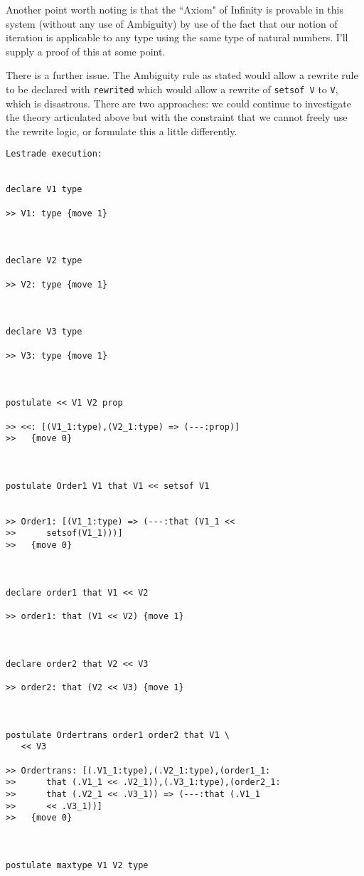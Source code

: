\documentclass[12pt]{article}
\begin{document}
Another point worth noting is that the ``Axiom" of Infinity is provable in this system (without any use of Ambiguity) by use of the fact that our notion of iteration is applicable to any type using the same type of natural numbers.  I'll supply a proof of this at some point.

There is a further issue.  The Ambiguity rule as stated would allow a rewrite rule to be declared with {\tt rewrited} which would allow a rewrite of {\tt setsof V} to {\tt V}, which is disastrous.  There are two approaches:  we could continue to investigate the theory articulated above but with the constraint
that we cannot freely use the rewrite logic, or formulate this a little differently.

\begin{verbatim}Lestrade execution:


declare V1 type

>> V1: type {move 1}



declare V2 type

>> V2: type {move 1}



declare V3 type

>> V3: type {move 1}



postulate << V1 V2 prop

>> <<: [(V1_1:type),(V2_1:type) => (---:prop)]
>>   {move 0}



postulate Order1 V1 that V1 << setsof V1


>> Order1: [(V1_1:type) => (---:that (V1_1 <<
>>      setsof(V1_1)))]
>>   {move 0}



declare order1 that V1 << V2

>> order1: that (V1 << V2) {move 1}



declare order2 that V2 << V3

>> order2: that (V2 << V3) {move 1}



postulate Ordertrans order1 order2 that V1 \
   << V3

>> Ordertrans: [(.V1_1:type),(.V2_1:type),(order1_1:
>>      that (.V1_1 << .V2_1)),(.V3_1:type),(order2_1:
>>      that (.V2_1 << .V3_1)) => (---:that (.V1_1
>>      << .V3_1))]
>>   {move 0}



postulate maxtype V1 V2 type


\end{verbatim}
\end{document}

